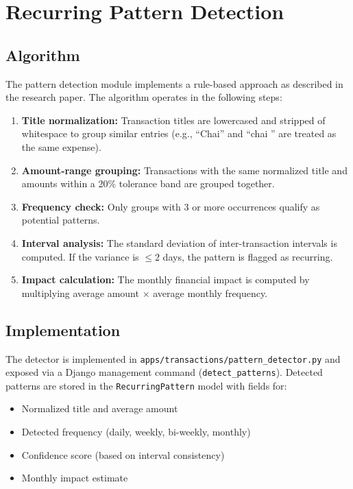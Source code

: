\documentclass[12pt,a4paper]{article}
\begin{document}
\section{Recurring Pattern Detection}

\subsection{Algorithm}
The pattern detection module implements a rule-based approach as described in the research paper.
The algorithm operates in the following steps:

\begin{enumerate}
  \item \textbf{Title normalization:} Transaction titles are lowercased and stripped of whitespace to group similar entries (e.g., ``Chai'' and ``chai '' are treated as the same expense).
  \item \textbf{Amount-range grouping:} Transactions with the same normalized title and amounts within a 20\% tolerance band are grouped together.
  \item \textbf{Frequency check:} Only groups with 3 or more occurrences qualify as potential patterns.
  \item \textbf{Interval analysis:} The standard deviation of inter-transaction intervals is computed. If the variance is $\leq 2$ days, the pattern is flagged as recurring.
  \item \textbf{Impact calculation:} The monthly financial impact is computed by multiplying average amount $\times$ average monthly frequency.
\end{enumerate}

\subsection{Implementation}
The detector is implemented in \texttt{apps/transactions/pattern\_detector.py} and exposed via a Django management command (\texttt{detect\_patterns}).
Detected patterns are stored in the \texttt{RecurringPattern} model with fields for:
\begin{itemize}
  \item Normalized title and average amount
  \item Detected frequency (daily, weekly, bi-weekly, monthly)
  \item Confidence score (based on interval consistency)
  \item Monthly impact estimate
\end{itemize}
\end{document}

